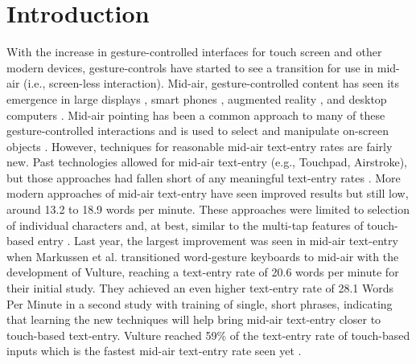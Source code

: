 \chapter{Introduction}
\hspace{\parindent}With the increase in gesture-controlled interfaces for touch screen and other modern devices, gesture-controls have started to see a transition for use in mid-air (i.e., screen-less interaction). Mid-air, gesture-controlled content has seen its emergence in large displays \cite{ref_pan_zoom_large_dispalys,ref_large_screen_pointing_gestures}, smart phones \cite{ref_multiscale_navigation}, augmented reality \cite{ref_augmented_reality}, and desktop computers \cite{ref_leap_painting,ref_darren_thesis,ref_alvin_thesis,ref_leap_pointing_device}. Mid-air pointing has been a common approach to many of these gesture-controlled interactions and is used to select and manipulate on-screen objects \cite{ref_large_display_pointing,ref_air_pointing,ref_ray_pointing_large_displays,ref_shadow_reaching,ref_freehand_pointing_large_displays,ref_large_screen_pointing_gestures}. However, techniques for reasonable mid-air text-entry rates are fairly new. Past technologies allowed for mid-air text-entry (e.g., Touchpad, Airstroke), but those approaches had fallen short of any meaningful text-entry rates \cite{ref_visual_touchpad,ref_airstroke}. More modern approaches of mid-air text-entry have seen improved results but still low, around 13.2 \cite{ref_selection_based_mid_air} to 18.9 \cite{ref_mid_air_text_large_displays} words per minute. These approaches were limited to selection of individual characters and, at best, similar to the multi-tap features of touch-based entry \cite{ref_selection_based_mid_air,ref_airstroke,ref_mid_air_text_large_displays}. Last year, the largest improvement was seen in mid-air text-entry when Markussen et al. \citeyear{ref_vulture} transitioned word-gesture keyboards to mid-air with the development of Vulture, reaching a text-entry rate of 20.6 words per minute for their initial study. They achieved an even higher text-entry rate of 28.1 Words Per Minute in a second study with training of single, short phrases, indicating that learning the new techniques will help bring mid-air text-entry closer to touch-based text-entry. Vulture reached 59\% of the text-entry rate of touch-based inputs which is the fastest mid-air text-entry rate seen yet \cite{ref_vulture}.

